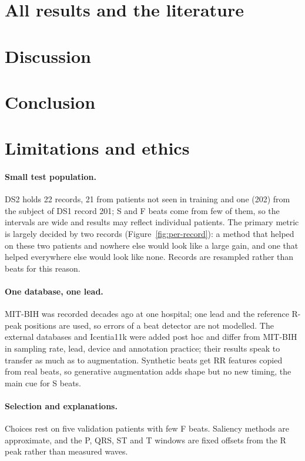 \documentclass[11pt]{article}
\begin{document}
\section{All results and the literature}\label{sec:all-results}


\section{Discussion}\label{sec:discussion}


\section{Conclusion}


\section{Limitations and ethics}\label{sec:limitations}
\paragraph{Small test population.} DS2 holds 22 records, 21 from patients not seen in training and one (202) from the subject of DS1
record 201; S and F beats come from few of them, so the intervals are wide and results may reflect individual patients. The primary
metric is largely decided by two records (Figure~\ref{fig:per-record}): a method that helped on these two patients and nowhere else would
look like a large gain, and one that helped everywhere else would look like none. Records are resampled rather than beats for this reason.

\paragraph{One database, one lead.} MIT-BIH was recorded decades ago at one hospital; one lead and the reference R-peak positions are
used, so errors of a beat detector are not modelled. The external databases and Icentia11k were added post hoc and differ from MIT-BIH in
sampling rate, lead, device and annotation practice; their results speak to transfer as much as to augmentation. Synthetic beats get RR
features copied from real beats, so generative augmentation adds shape but no new timing, the main cue for S beats.

\paragraph{Selection and explanations.} Choices rest on five validation patients with few F beats. Saliency methods are approximate, and
the P, QRS, ST and T windows are fixed offsets from the R peak rather than measured waves.
\end{document}
